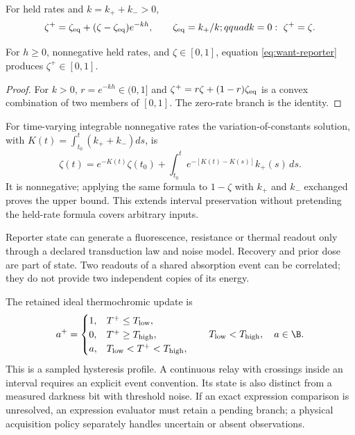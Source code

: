 For held rates and $k=k_++k_->0$,
\begin{equation}
 \zeta^+=\zeta_{\rm eq}+(\zeta-\zeta_{\rm eq})e^{-kh},\qquad
 \zeta_{\rm eq}=k_+/k;qquad
 k=0:\ \zeta^+=\zeta .
 \label{eq:want-reporter}
\end{equation}
\begin{proposition}
For $h\ge0$, nonnegative held rates, and $\zeta\in[0,1]$,
equation \eqref{eq:want-reporter} produces $\zeta^+\in[0,1]$.
\end{proposition}
\begin{proof}
For $k>0$, $r=e^{-kh}\in(0,1]$ and
$\zeta^+=r\zeta+(1-r)\zeta_{\rm eq}$ is a convex combination of two
members of $[0,1]$. The zero-rate branch is the identity.
\end{proof}
For time-varying integrable nonnegative rates the variation-of-constants
solution, with $K(t)=\int_{t_0}^t(k_++k_-)ds$, is
\begin{equation}
 \zeta(t)=e^{-K(t)}\zeta(t_0)
           +\int_{t_0}^t e^{-[K(t)-K(s)]}k_+(s)\,ds .
\end{equation}
It is nonnegative; applying the same formula to $1-\zeta$ with $k_+$ and
$k_-$ exchanged proves the upper bound. This extends interval preservation
without pretending the held-rate formula covers arbitrary inputs.

Reporter state can generate a fluorescence, resistance or thermal readout
only through a declared transduction law and noise model. Recovery and prior
dose are part of state. Two readouts of a shared absorption event can be
correlated; they do not provide two independent copies of its energy.

The retained ideal thermochromic update is
\begin{equation}
 a^+=\begin{cases}
 1,&T^+\le T_{\rm low},\\
 0,&T^+\ge T_{\rm high},\\
 a,&T_{\rm low}<T^+<T_{\rm high},
 \end{cases}\qquad T_{\rm low}<T_{\rm high},\quad a\in\B .
\end{equation}
This is a sampled hysteresis profile. A continuous relay with crossings
inside an interval requires an explicit event convention. Its state is also
distinct from a measured darkness bit with threshold noise. If an exact
expression comparison is unresolved, an expression evaluator must retain a
pending branch; a physical acquisition policy separately handles uncertain
or absent observations.

